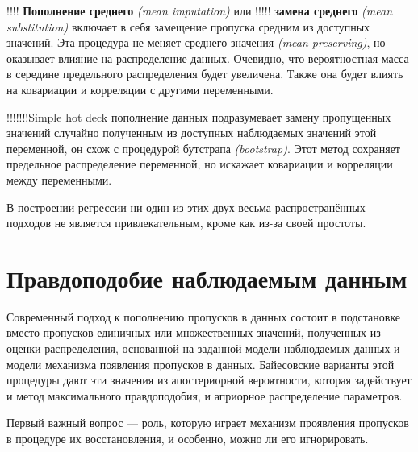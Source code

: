 !!!! {\bf Пополнение среднего} \emph{(mean imputation)} или !!!!! {\bf замена среднего} \emph{(mean substitution)} включает в себя замещение пропуска средним из доступных значений. Эта процедура не меняет среднего значения \emph{(mean-preserving)}, но оказывает влияние на распределение данных. Очевидно, что вероятностная масса в середине предельного распределения будет увеличена. Также она будет влиять на ковариации и корреляции с другими переменными.

!!!!!!!Simple hot deck пополнение данных подразумевает замену пропущенных значений случайно полученным из доступных наблюдаемых значений этой переменной, он схож с процедурой бутстрапа \emph{(bootstrap)}. Этот метод сохраняет предельное распределение переменной, но искажает ковариации и корреляции между переменными. 

В построении регрессии ни один из этих двух весьма распространённых подходов не является привлекательным, кроме как из-за своей простоты.

\section{Правдоподобие наблюдаемым данным} 

Современный подход к пополнению пропусков в данных состоит в подстановке вместо пропусков единичных или множественных значений, полученных из оценки распределения, основанной на заданной модели наблюдаемых данных и модели механизма появления пропусков в данных. Байесовские варианты этой процедуры дают эти значения из апостериорной вероятности, которая задействует и метод максимального правдоподобия, и априорное распределение параметров.

Первый важный вопрос --– роль, которую играет механизм проявления пропусков в процедуре их восстановления, и особенно, можно ли его игнорировать.


